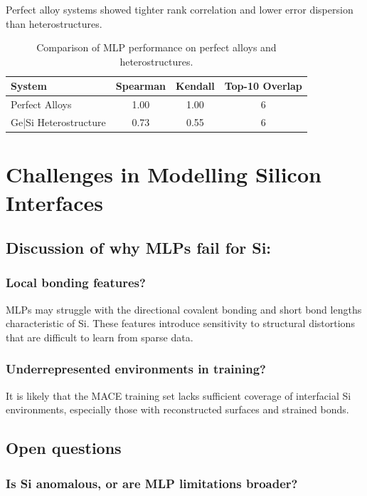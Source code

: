 Perfect alloy systems showed tighter rank correlation and lower error dispersion than heterostructures.

\begin{table}[h]
    \centering
    \caption{Comparison of MLP performance on perfect alloys and heterostructures.}
    \begin{tabular}{lccc}
        System & Spearman & Kendall & Top-10 Overlap \\
        \hline
        Perfect Alloys & 1.00 & 1.00 & 6 \\
        Ge|Si Heterostructure & 0.73 & 0.55 & 6 \\
    \end{tabular}
\end{table}

\section{Challenges in Modelling Silicon Interfaces} \label{section:challenges_in_modelling_silicon_interfaces}

\subsection{Discussion of why MLPs fail for Si:}

\subsubsection{Local bonding features?}

MLPs may struggle with the directional covalent bonding and short bond lengths characteristic of Si. These features introduce sensitivity to structural distortions that are difficult to learn from sparse data.

\subsubsection{Underrepresented environments in training?}

It is likely that the MACE training set lacks sufficient coverage of interfacial Si environments, especially those with reconstructed surfaces and strained bonds.

\subsection{Open questions}

\subsubsection{Is Si anomalous, or are MLP limitations broader?}

